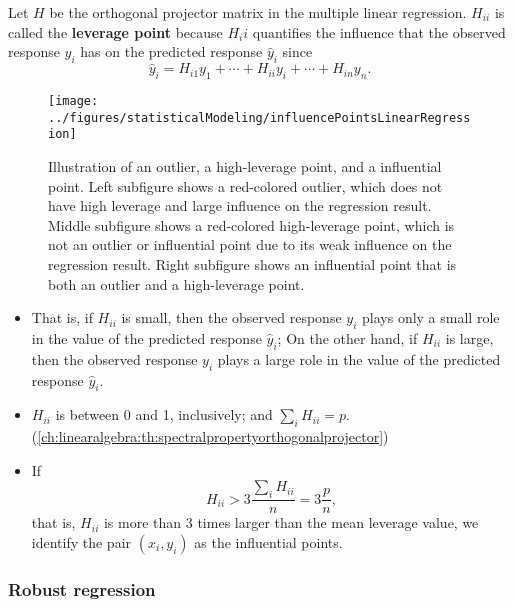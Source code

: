 \begin{refsection}
\begin{definition}[leverage]
Let $H$ be the orthogonal projector matrix in the multiple linear regression. $H_{ii}$ is called the \textbf{leverage point} because $H_ii$ quantifies the influence that the observed response $y_i$ has on the predicted response $\hat{y}_i$ since
$$\hat{y}_i = H_{i1}y_1 + \cdots + H_{ii}y_i + \cdots + H_{in}y_n.$$	
\end{definition}

\begin{figure}[H]
	\centering
	\texttt{[image: ../figures/statisticalModeling/influencePointsLinearRegression]}
	\caption{Illustration of an outlier, a high-leverage point, and a influential point. Left subfigure shows a red-colored outlier, which does not have high leverage and large influence on the regression result. Middle subfigure shows a red-colored high-leverage point, which is not an outlier or influential point due to its weak influence on the regression result. Right subfigure shows an influential point that is both an outlier and a high-leverage point.}
	\label{fig:influencepointslinearregression}
\end{figure}


\begin{note}\hfill
\begin{itemize}
	\item That is, if $H_{ii}$ is small, then the observed response $y_i$ plays only a small role in the value of the predicted response $\hat{y}_i$; On the other hand, if $H_{ii}$ is large, then the observed response $y_i$ plays a large role in the value of the predicted response $\hat{y}_i$.
	\item $H_{ii}$ is between 0 and 1, inclusively; and $\sum_i H_{ii} = p$.(\autoref{ch:linearalgebra:th:spectralpropertyorthogonalprojector})
	\item If $$H_{ii} > 3\frac{\sum_i H_{ii}}{n} = 3\frac{p}{n},$$
	that is, $H_{ii}$ is more than 3 times larger than the mean leverage value, we identify the pair $(x_i,y_i)$ as the influential points. 
\end{itemize}	
\end{note}






\subsubsection{Robust regression}




\end{refsection}
